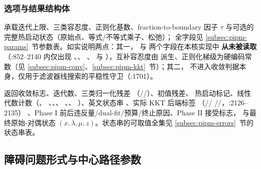 \subsubsection*{选项与结果结构体}
 承载迭代上限、三类容忍度、正则化基数、fraction-to-boundary
因子 $\tau$ 与可选的完整热启动状态（原始点、等式/不等式乘子、松弛）；
全字段见 \ref{subsec:pipm-params}~节参数表。如实说明两点：其一，
 与  两个字段在本核实现中
\textbf{从未被读取}（:852--2140 内仅出现 、、
、 与 ），互补容忍度由
 派生、正则化梯级为硬编码常数（见
\ref{subsec:pipm-conv}、\ref{subsec:pipm-kkt}~节）；其二，
不进入收敛判据本身，仅用于滤波器线搜索的平稳性守卫（:1701）。

 返回收敛标志、迭代数、三类归一化残差
（//）、初值残差、
热启动标记、线性代数计数（、
、、、
、、
）、英文状态串 、实际 KKT 后端标签
（//
//，:2126--2135）
、Phase I 前后违反量/dual-fit/预算/终止原因、Phase II 接受标志，
与最终原始-对偶状态 $(x,\lambda,\mu,z)$。状态串的可取值全集见
\ref{subsec:pipm-errors}~节的状态串表。

\subsection{障碍问题形式与中心路径参数}\label{subsec:pipm-barrier}

